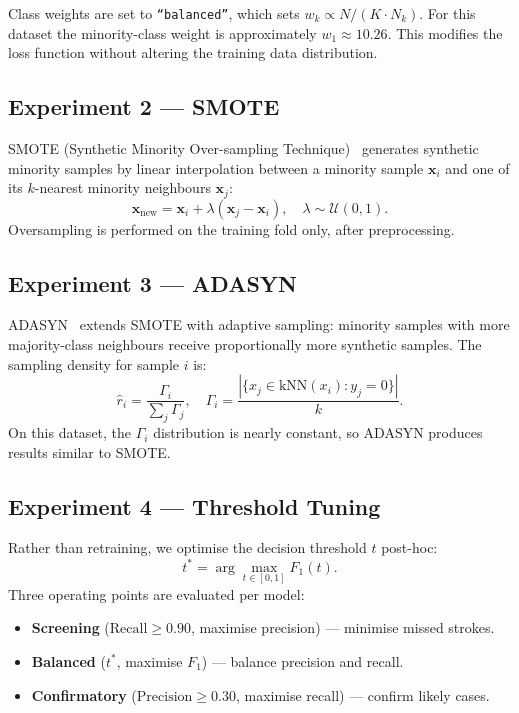 \documentclass[11pt,a4paper]{article}
\begin{document}
Class weights are set to \texttt{``balanced''}, which sets $w_k \propto N/(K \cdot N_k)$.
For this dataset the minority-class weight is approximately $w_1 \approx 10.26$.
This modifies the loss function without altering the training data distribution.

\subsection{Experiment 2 — SMOTE}

SMOTE (Synthetic Minority Over-sampling Technique)~\cite{chawla2002smote} generates synthetic minority samples by linear interpolation between a minority sample $\mathbf{x}_i$ and one of its $k$-nearest minority neighbours $\mathbf{x}_j$:
\[
  \mathbf{x}_{\text{new}} = \mathbf{x}_i + \lambda(\mathbf{x}_j - \mathbf{x}_i), \quad \lambda \sim \mathcal{U}(0,1).
\]
Oversampling is performed on the training fold only, after preprocessing.

\subsection{Experiment 3 — ADASYN}

ADASYN~\cite{he2008adasyn} extends SMOTE with adaptive sampling: minority samples with more majority-class neighbours receive proportionally more synthetic samples.
The sampling density for sample $i$ is:
\[
  \hat{r}_i = \frac{\Gamma_i}{\sum_j \Gamma_j}, \quad
  \Gamma_i = \frac{|\{x_j \in \text{kNN}(x_i) : y_j = 0\}|}{k}.
\]
On this dataset, the $\Gamma_i$ distribution is nearly constant, so ADASYN produces results similar to SMOTE.

\subsection{Experiment 4 — Threshold Tuning}

Rather than retraining, we optimise the decision threshold $t$ post-hoc:
\[
  t^* = \arg\max_{t \in [0,1]} F_1(t).
\]
Three operating points are evaluated per model:
\begin{itemize}
  \item \textbf{Screening} ($\text{Recall} \geq 0.90$, maximise precision) — minimise missed strokes.
  \item \textbf{Balanced} ($t^*$, maximise $F_1$) — balance precision and recall.
  \item \textbf{Confirmatory} ($\text{Precision} \geq 0.30$, maximise recall) — confirm likely cases.
\end{itemize}
\end{document}

